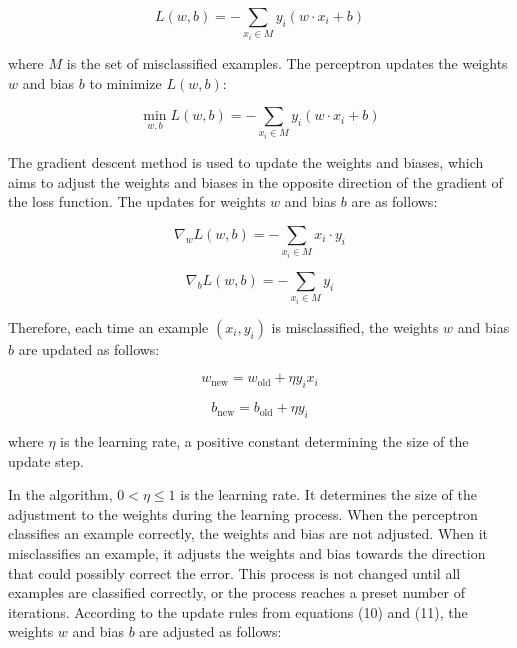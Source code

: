 \documentclass[12pt,a4paper]{report}
\begin{document}
\begin{equation}
L(w,b) = - \sum_{x_i \in M} y_i (w \cdot x_i + b)
\end{equation}

where \( M \) is the set of misclassified examples. The perceptron updates the weights \( w \) and bias \( b \) to minimize \( L(w,b) \):

\begin{equation}
\min_{w,b} L(w,b) = - \sum_{x_i \in M} y_i (w \cdot x_i + b)
\end{equation}

The gradient descent method is used to update the weights and biases, which aims to adjust the weights and biases in the opposite direction of the gradient of the loss function. The updates for weights \( w \) and bias \( b \) are as follows:

\begin{equation}
\nabla_w L(w,b) = - \sum_{x_i \in M} x_i \cdot y_i
\end{equation}

\begin{equation}
\nabla_b L(w,b) = - \sum_{x_i \in M} y_i
\end{equation}

Therefore, each time an example \( (x_i, y_i) \) is misclassified, the weights \( w \) and bias \( b \) are updated as follows:

\begin{equation}
w_{\text{new}} = w_{\text{old}} + \eta y_i x_i
\end{equation}

\begin{equation}
b_{\text{new}} = b_{\text{old}} + \eta y_i
\end{equation}

where \( \eta \) is the learning rate, a positive constant determining the size of the update step.


In the algorithm, \( 0 < \eta \leq 1 \) is the learning rate. It determines the size of the adjustment to the weights during the learning process. When the perceptron classifies an example correctly, the weights and bias are not adjusted. When it misclassifies an example, it adjusts the weights and bias towards the direction that could possibly correct the error. This process is not changed until all examples are classified correctly, or the process reaches a preset number of iterations. According to the update rules from equations (10) and (11), the weights \( w \) and bias \( b \) are adjusted as follows:
\end{document}
